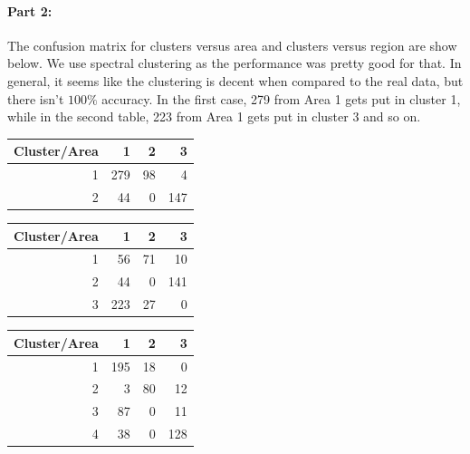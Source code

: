 \documentclass[12pt, leqno]{article}
\begin{document}
\paragraph{Part 2:} The confusion matrix for clusters versus area and
clusters versus region are show below. We use spectral clustering as
the performance was pretty good for that. In general, it seems like
the clustering is decent when compared to the real data, but there
isn't $100\%$ accuracy. In the first case, 279 from Area 1 gets
put in cluster 1, while in the second table, 223 from Area 1 gets put
in cluster 3 and so on.
\begin{table}[ht]
\centering
\begin{tabular}{rrrr}
  \hline
Cluster/Area & 1 & 2 & 3 \\ 
  \hline
1 & 279 &  98 &   4 \\ 
  2 &  44 &   0 & 147 \\ 
   \hline
\end{tabular}
\end{table}

\begin{table}[ht]
\centering
\begin{tabular}{rrrr}
  \hline
Cluster/Area & 1 & 2 & 3 \\ 
  \hline
1 &  56 &  71 &  10 \\ 
  2 &  44 &   0 & 141 \\ 
  3 & 223 &  27 &   0 \\ 
   \hline
\end{tabular}
\end{table}

\begin{table}[ht]
\centering
\begin{tabular}{rrrr}
  \hline
Cluster/Area & 1 & 2 & 3 \\ 
  \hline
1 & 195 &  18 &   0 \\ 
  2 &   3 &  80 &  12 \\ 
  3 &  87 &   0 &  11 \\ 
  4 &  38 &   0 & 128 \\ 
   \hline
\end{tabular}
\end{table}
\end{document}
